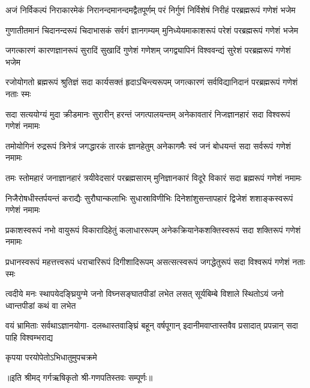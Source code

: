


\fourlineindentedshloka
{अजं निर्विकल्पं निराकारमेकं}
{निरानन्दमानन्दमद्वैतपूर्णम्}
{परं निर्गुणं निर्विशेषं निरीहं}
{परब्रह्मरूपं गणेशं भजेम}%

\fourlineindentedshloka
{गुणातीतमानं चिदानन्दरूपं}
{चिदाभासकं सर्वगं ज्ञानगम्यम्}
{मुनिध्येयमाकाशरूपं परेशं}
{परब्रह्मरूपं गणेशं भजेम}%

\fourlineindentedshloka
{जगत्कारणं कारणज्ञानरूपं}
{सुरादिं सुखादिं गुणेशं गणेशम्}
{जगद्व्यापिनं विश्ववन्द्यं सुरेशं}
{परब्रह्मरूपं गणेशं भजेम}%

\fourlineindentedshloka
{रजोयोगतो ब्रह्मरूपं श्रुतिज्ञं}
{सदा कार्यसक्तं हृदाऽचिन्त्यरूपम्}
{जगत्कारणं सर्वविद्यानिदानं}
{परब्रह्मरूपं गणेशं नताः स्मः}%

\fourlineindentedshloka
{सदा सत्ययोग्यं मुदा क्रीडमानः}
{सुरारीन् हरन्तं जगत्पालयन्तम्}
{अनेकावतारं निजज्ञानहारं}
{सदा विश्वरूपं गणेशं नमामः}%


\fourlineindentedshloka
{तमोयोगिनं रुद्ररूपं त्रिनेत्रं}
{जगद्धारकं तारकं ज्ञानहेतुम्}
{अनेकागमैः स्वं जनं बोधयन्तं}
{सदा सर्वरूपं गणेशं नमामः}%

\fourlineindentedshloka
{तमः स्तोमहारं जनाज्ञानहारं}
{त्रयीवेदसारं परब्रह्मसारम्}
{मुनिज्ञानकारं विदूरे विकारं}
{सदा ब्रह्मरूपं गणेशं नमामः}%

\fourlineindentedshloka
{निजैरोषधीस्तर्पयन्तं कराद्यैः}
{सुरौघान्कलाभिः सुधास्राविणीभिः}
{दिनेशांशुसन्तापहारं द्विजेशं}
{शशाङ्कस्वरूपं गणेशं नमामः}%

\fourlineindentedshloka
{प्रकाशस्वरूपं नभो वायुरूपं}
{विकारादिहेतुं कलाधाररूपम्}
{अनेकक्रियानेकशक्तिस्वरूपं}
{सदा शक्तिरूपं गणेशं नमामः}%

\fourlineindentedshloka
{प्रधानस्वरूपं महत्तत्त्वरूपं}
{धराचारिरूपं दिगीशादिरूपम्}
{असत्सत्स्वरूपं जगद्धेतुरूपं}
{सदा विश्वरूपं गणेशं नताः स्मः}%

\fourlineindentedshloka
{त्वदीये मनः स्थापयेदङ्घ्रियुग्मे}
{जनो विघ्नसङ्घातपीडां लभेत}
{लसत् सूर्यबिम्बे विशाले स्थितोऽयं}
{जनो ध्वान्तपीडां कथं वा लभेत}%

\fourlineindentedshloka
{वयं भ्रामिताः सर्वथाऽज्ञानयोगा-}
{दलब्धास्तवाङ्घ्रिं बहून् वर्षपूगान्}
{इदानीमवाप्तास्तवैव प्रसादात्}
{प्रपन्नान् सदा पाहि विश्वम्भराद्य}%

{कृपया परयोपेतोऽभिधातुमुपचक्रमे}%

॥इति श्रीमद् गर्गऋषिकृतो श्री-गणपतिस्तवः सम्पूर्णः॥
